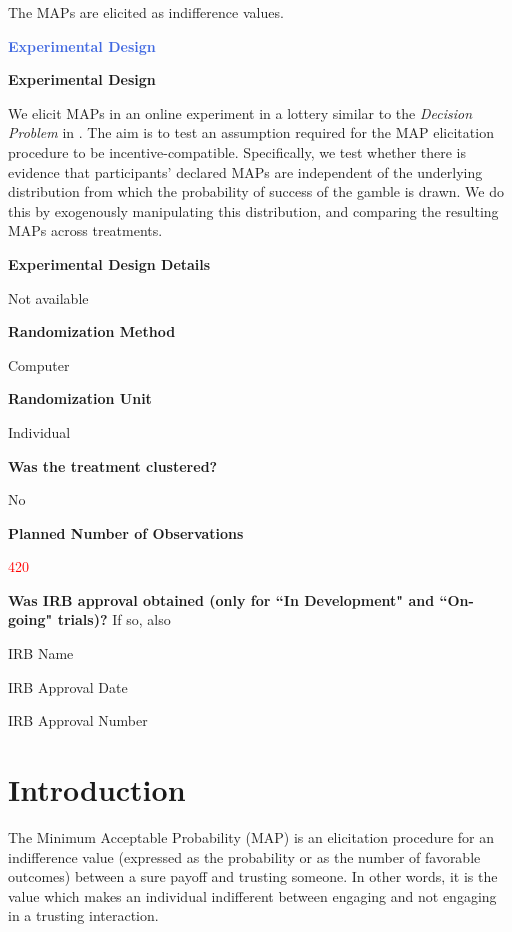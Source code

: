 The MAPs are elicited as indifference values. 



\large \noindent \textcolor{RoyalBlue}{\textbf{Experimental Design}}

\normalsize \noindent \textcolor{NavyBlue}{\textbf{Experimental Design}}

We elicit MAPs in an online experiment in a lottery similar to the \textit{Decision Problem} in \cite{Bohnet2004}.
The aim is to test an assumption required for the MAP elicitation procedure to be incentive-compatible.
Specifically, we test whether there is evidence that participants' declared MAPs are independent of the underlying distribution from which the probability of success of the gamble is drawn.
We do this by exogenously manipulating this distribution, and comparing the resulting MAPs across treatments.

\noindent \textcolor{NavyBlue}{\textbf{Experimental Design Details}}

Not available

\noindent \textcolor{NavyBlue}{\textbf{Randomization Method}}

Computer

\noindent \textcolor{NavyBlue}{\textbf{Randomization Unit}}

Individual

\noindent \textcolor{NavyBlue}{\textbf{Was the treatment clustered?}}

No

\noindent \textcolor{NavyBlue}{\textbf{Planned Number of Observations}}

\textcolor{red}{420}
    
\noindent \textcolor{NavyBlue}{\textbf{Was IRB approval obtained (only for ``In Development" and ``On-going" trials)?}} If so, also

        IRB Name
        
        IRB Approval Date
        
        IRB Approval Number





\section{Introduction}
The Minimum Acceptable Probability (MAP) is an elicitation procedure for an indifference value (expressed as the probability or as the number of favorable outcomes) between a sure payoff and trusting someone.
In other words, it is the value which makes an individual indifferent between engaging and not engaging in a trusting interaction.

